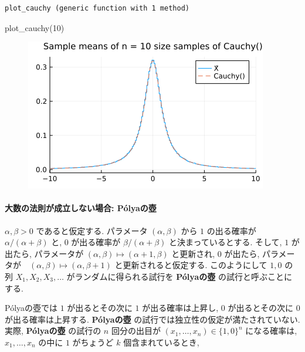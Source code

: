 \documentclass[
  letterpaper,
  DIV=11,
  numbers=noendperiod]{scrartcl}
\let\oldparagraph\paragraph
\renewcommand{\paragraph}[1]{\oldparagraph{#1}\mbox{}}
\newenvironment{Shaded}{\begin{snugshade}}{\end{snugshade}}
\newcommand{\FloatTok}[1]{\textcolor[rgb]{0.68,0.00,0.00}{#1}}
\newcommand{\FunctionTok}[1]{\textcolor[rgb]{0.28,0.35,0.67}{#1}}
\newcommand{\NormalTok}[1]{\textcolor[rgb]{0.00,0.23,0.31}{#1}}
\begin{document}
\begin{verbatim}
plot_cauchy (generic function with 1 method)
\end{verbatim}

\begin{Shaded}
\begin{Highlighting}[]
\FunctionTok{plot\_cauchy}\NormalTok{(}\FloatTok{10}\NormalTok{)}
\end{Highlighting}
\end{Shaded}

\begin{figure}[H]

{\centering \includegraphics{05 Central limit theorem_files/figure-pdf/cell-18-output-1.png}

}

\end{figure}

\hypertarget{ux5927ux6570ux306eux6cd5ux5247ux304cux6210ux7acbux3057ux306aux3044ux5834ux5408-puxf3lyaux306eux58fa}{%
\paragraph{大数の法則が成立しない場合:
Pólyaの壺}\label{ux5927ux6570ux306eux6cd5ux5247ux304cux6210ux7acbux3057ux306aux3044ux5834ux5408-puxf3lyaux306eux58fa}}

\(\alpha, \beta > 0\) であると仮定する. パラメータ \((\alpha,\beta)\)
から \(1\) の出る確率が \(\alpha/(\alpha+\beta)\) と, \(0\) が出る確率が
\(\beta/(\alpha+\beta)\) と決まっているとする. そして, \(1\) が出たら,
パラメータが \((\alpha,\beta)\mapsto(\alpha+1,\beta)\) と更新され, \(0\)
が出たら, パラメータが　\((\alpha,\beta)\mapsto(\alpha,\beta+1)\)
と更新されると仮定する. このようにして \(1,0\) の列
\(X_1,X_2,X_3,\ldots\) がランダムに得られる試行を \textbf{Pólyaの壺}
の試行と呼ぶことにする.

Pólyaの壺では \(1\) が出るとその次に \(1\) が出る確率は上昇し, \(0\)
が出るとその次に \(0\) が出る確率は上昇する. \textbf{Pólyaの壺}
の試行では独立性の仮定が満たされていない. 実際, \textbf{Pólyaの壺}
の試行の \(n\) 回分の出目が \((x_1,\ldots,x_n)\in\{1,0\}^n\)
になる確率は, \(x_1,\ldots,x_n\) の中に \(1\) がちょうど \(k\)
個含まれているとき,
\end{document}
